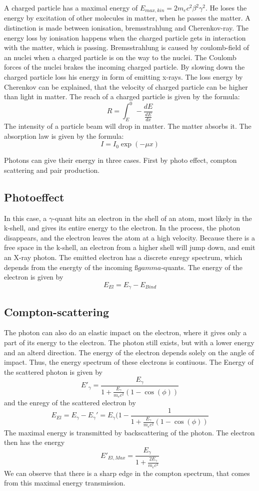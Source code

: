 \documentclass[10pt,a4paper]{article}
\begin{document}
A charged particle has a maximal energy of $E_{max,kin} = 2 m_e c^2 \beta^2 \gamma^2$. He loses the energy by excitation of other molecules in matter, when he passes the matter. A distinction is made between ionisation, bremsstrahlung and Cherenkov-ray. The energy loss by ionisation happens when the charged particle gets in interaction with the matter, which is passing. Bremsstrahlung is caused by coulomb-field of an nuclei when a charged particle is on the way to the nuclei. The Coulomb forces of the nuclei brakes the incoming charged particle. By slowing down the charged particle loss his energy in form of emitting x-rays.  
The loss energy by Cherenkov can be explained, that the velocity of charged particle can be higher than light in matter. 
The reach of a charged particle is given by the formula:
\[R = \int^{0}_{E} - \frac{dE}{\frac{dE}{dx}}\]
The intensity of a particle beam will drop in matter. The matter absorbs it. The absorption law is given by the formula:
\[I = I_0 \exp (-\mu x)\]

Photons can give their energy in three cases. First by photo effect, compton scattering and pair production.
\subsection{Photoeffect}
In this case, a $\gamma$-quant hits an electron in the shell of an atom, most likely in the k-shell, and gives its entire energy to the electron. In the process, the photon disappears, and the electron leaves the atom at a high velocity. Because there is a free space in the k-shell, an electron from a higher shell will jump down, and emit an X-ray photon. The emitted electron has a discrete enregy spectrum, which depends from the energty of the incoming $ßgamma$-quants. The energy of the electron is given by \[E_{El}=E_{\gamma}-E_{Bind}\]

\subsection{Compton-scattering}
The photon can also do an elastic impact on the electron, where it gives only a part of its energy to the electron. The photon still exists, but with a lower energy and an alterd direction. The energy of the electron depends solely on the angle of impact. Thus, the energy spectrum of these electrons is contiuous. The Energy of the scattered photon is given by
\[E'_{\gamma} = \frac{E_{\gamma}}{1+\frac{E_{\gamma}}{m_{e} c^{2}}(1-\cos(\phi))}\]and the enregy of the scattered electron by \[E_{El} = E_{\gamma}-E_{\gamma}' = E_{\gamma} (1-\frac{1}{1+\frac{E_{\gamma}}{m_{e} c^{2}}(1-\cos(\phi))}\] The maximal energy is transmitted by backscattering of the photon. The electron then has the energy \[E'_{El, Max} = \frac{E_{\gamma}}{1+ \frac{2 E_{\gamma}}{m_{e} c^{2}}} \]We can observe that there is a sharp edge in the  compton spectrum, that comes from this maximal energy transmission.
\end{document}
